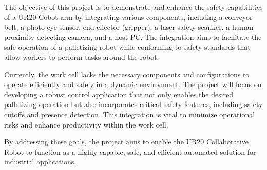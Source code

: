 The objective of this project is to demonstrate and enhance the safety capabilities of a UR20 Cobot arm by integrating various components, including a conveyor belt, a photo-eye sensor, end-effector (gripper), a laser safety scanner, a human proximity detecting camera, and a host PC. The integration aims to facilitate the safe operation of a palletizing robot while conforming to safety standards that allow workers to perform tasks around the robot.

Currently, the work cell lacks the necessary components and configurations to operate efficiently and safely in a dynamic environment. The project will focus on developing a robust control application that not only enables the desired palletizing operation but also incorporates critical safety features, including safety cutoffs and presence
detection. This integration is vital to minimize operational risks and enhance productivity within the work cell.

By addressing these goals, the project aims to enable the UR20 Collaborative Robot to function as a highly capable, safe, and efficient automated solution for industrial applications.